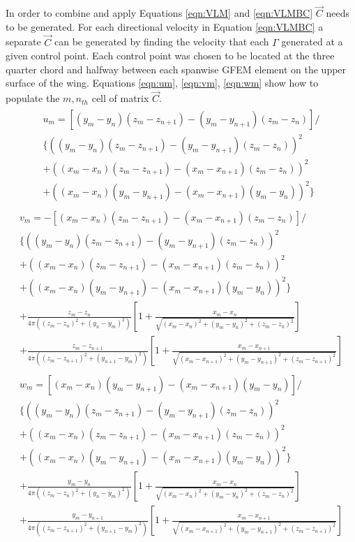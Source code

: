 \documentclass[11pt]{ucthesis}
\begin{document}
In order to combine and apply Equations \ref{eqn:VLM} and \ref{eqn:VLMBC} $\vec{C}$ needs to be generated. For each directional velocity in Equation \ref{eqn:VLMBC} a separate $\vec{C}$ can be generated by finding the velocity that each $\Gamma$ generated at a given control point. Each control point was chosen to be located at the three quarter chord and halfway between each spanwise GFEM element on the upper surface of the wing. Equations \ref{eqn:um}, \ref{eqn:vm}, \ref{eqn:wm} show how to populate the $m,n_{th}$ cell of matrix $\vec{C}$.
\begin{eqnarray}
	\begin{array}{ll}
		u_m = [(y_m-y_n)(z_m-z_{n+1})-(y_m-y_{n+1})(z_m-z_n)]/\\
		\{((y_m-y_n)(z_m-z_{n+1})-(y_m-y_{n+1})(z_m-z_n))^2\\
		+((x_m-x_n)(z_m-z_{n+1})-(x_m-x_{n+1})(z_m-z_n))^2\\
		+((x_m-x_n)(y_m-y_{n+1})-(x_m-x_{n+1})(y_m-y_n))^2\}
	\end{array}
\label{eqn:um}
\end{eqnarray}
\begin{eqnarray}
	\begin{array}{ll}
		v_m = -[(x_m-x_n)(z_m-z_{n+1})-(x_m-x_{n+1})(z_m-z_n)]/\\
		\{((y_m-y_n)(z_m-z_{n+1})-(y_m-y_{n+1})(z_m-z_n))^2\\
		+((x_m-x_n)(z_m-z_{n+1})-(x_m-x_{n+1})(z_m-z_n))^2\\
		+((x_m-x_n)(y_m-y_{n+1})-(x_m-x_{n+1})(y_m-y_n))^2\}\\
		+\frac{z_m-z_n}{4\pi((z_m-z_n)^2+(y_n-y_m)^2)}\left[1+\frac{x_m-x_n}{\sqrt{(x_m-x_n)^2+(y_m-y_n)^2+(z_m-z_n)^2}}\right]\\
		+\frac{z_m-z_{n+1}}{4\pi((z_m-z_{n+1})^2+(y_{n+1}-y_m)^2)}\left[1+\frac{x_m-x_{n+1}}{\sqrt{(x_m-x_{n+1})^2+(y_m-y_{n+1})^2+(z_m-z_{n+1})^2}}\right]
	\end{array}
\label{eqn:vm}
\end{eqnarray}
\begin{eqnarray}
	\begin{array}{ll}
		w_m = [(x_m-x_n)(y_m-y_{n+1})-(x_m-x_{n+1})(y_m-y_n)]/\\
		\{((y_m-y_n)(z_m-z_{n+1})-(y_m-y_{n+1})(z_m-z_n))^2\\
		+((x_m-x_n)(z_m-z_{n+1})-(x_m-x_{n+1})(z_m-z_n))^2\\
		+((x_m-x_n)(y_m-y_{n+1})-(x_m-x_{n+1})(y_m-y_n))^2\}\\
		+\frac{y_m-y_n}{4\pi((z_m-z_n)^2+(y_n-y_m)^2)}\left[1+\frac{x_m-x_n}{\sqrt{(x_m-x_n)^2+(y_m-y_n)^2+(z_m-z_n)^2}}\right]\\
		+\frac{y_m-y_{n+1}}{4\pi((z_m-z_{n+1})^2+(y_{n+1}-y_m)^2)}\left[1+\frac{x_m-x_{n+1}}{\sqrt{(x_m-x_{n+1})^2+(y_m-y_{n+1})^2+(z_m-z_{n+1})^2}}\right]
	\end{array}
\label{eqn:wm}
\end{eqnarray}
\end{document}
